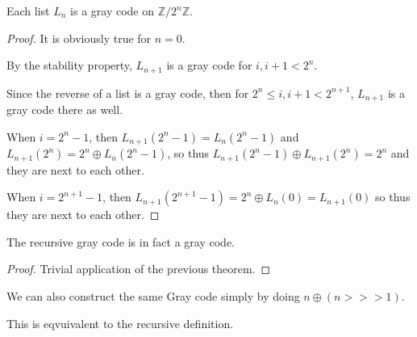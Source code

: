 \begin{theorem}
    \label{thm:list_gray_code_correctness}

    Each list $L_n$ is a gray code on $\mathbb{Z} / 2^n \mathbb{Z}$.
\end{theorem}

\begin{proof}
    It is obviously true for $n = 0$.

    By the stability property, $L_{n+1}$ is a gray code for $i, i+1 < 2^n$.

    Since the reverse of a list is a gray code, then for $2^n \le i, i+1 < 2^{n+1}$, 
    $L_{n+1}$ is a gray code there as well.

    When $i = 2^n - 1$, then $L_{n+1}(2^n - 1) = L_{n}(2^n - 1)$ and $L_{n+1}(2^n) = 2^n \oplus L_{n}(2^n - 1)$,
    so thus $L_{n+1}(2^n - 1) \oplus L_{n+1}(2^n) = 2^n$ and they are next to each other.

    When $i = 2^{n+1} - 1$, then $L_{n+1}(2^{n+1} - 1) = 2^n \oplus L_{n}(0) = L_{n+1}(0)$ so thus they are next to each other.
\end{proof}

\begin{theorem}
    \label{thm:recursive_gray_code_correctness}


    The recursive gray code is in fact a gray code.
\end{theorem}

\begin{proof}
    Trivial application of the previous theorem.
\end{proof}

\begin{definition}
    \label{def:direct_gray_code}
    We can also construct the same Gray code simply by doing $n \oplus (n >>> 1)$.
\end{definition}

\begin{theorem}
    \label{def:direct_is_recursive}

    This is eqvuivalent to the recursive definition.
\end{theorem}

